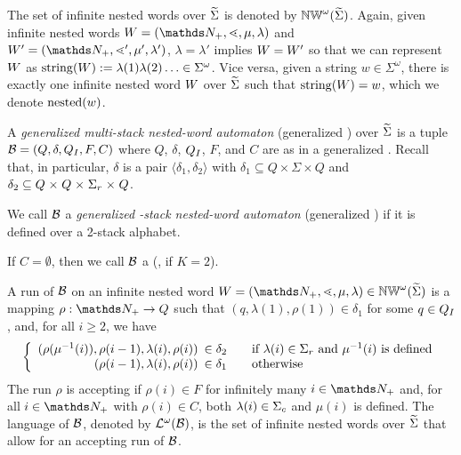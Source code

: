 \documentclass{LMCS}
\begin{document}
The set of infinite nested words over $\widetilde{\Sigma}$ is denoted by
$\mathbb{NW}^\omega(\widetilde{\Sigma})$.
Again, given infinite nested words $\nword=(\infDom,\succord,\mu,\lambda)$ and
$\nword'=(\infDom,\succord',\mu',\lambda')$, $\lambda=\lambda'$ implies
$W = W'$ so that we can represent $W$ as $\mathrm{string}(W) :=
\lambda(1) \lambda(2) \ldots \in \Sigma^\omega$.
Vice versa, given a string $w \in \Sigma^\omega$, there is exactly one
infinite nested word $W$ over $\widetilde{\Sigma}$ such that $\mathrm{string}(W) = w$,
which we denote $\mathrm{nested}(w)$.



\begin{defi}
  A \emph{generalized \Buchi multi-stack nested-word automaton} (generalized
  \Buchi \MNWA) over $\widetilde{\Sigma}$ is a tuple $\mathcal{B}=(Q,\delta,Q_I,F,C)$ where
  $Q$, $\delta$, $Q_I$, $F$, and $C$ are as in a generalized \MNWA. Recall
  that, in particular, $\delta$ is a pair $\langle \delta_1,\delta_2 \rangle$
  with $\delta_1 \mathrel{\subseteq} Q \mathrel{\times} \Sigma
  \mathrel{\times} Q$ and $\delta_2 \mathrel{\subseteq} Q \mathrel{\times} Q
  \mathrel{\times} \Sigma_r \mathrel{\times} Q$.

  We call $\mathcal{B}$ a \emph{generalized -stack nested-word automaton}
  (generalized \Buchi \tNWA) if it is defined over a 2-stack alphabet.

  If $C=\emptyset$, then we call $\mathcal{B}$ a \Buchi \MNWA (\Buchi \tNWA, if
  $K=2$).
\end{defi}

A run of $\mathcal{B}$ on an infinite nested word
$\nword=(\infDom,\succord,\mu,\lambda) \in \infNW(\crSigma)$ is a mapping
$\rho: \infDom \rightarrow Q$ such that $(q,\lambda(1),\rho(1)) \in \delta_1$
for some $q \in Q_I$, and, for all $i \ge 2$, we have
 \[\left\{
 \begin{array}{rll}
   (\rho(\mu^{-1}(i)),\rho(i-1),\lambda(i),\rho(i)) & \!\!\!\in \delta_2 &~~ \text{~if~}
   \lambda(i) \in \Sigma_r \text{~and~} \mu^{-1}(i) \text{~is~defined}\\
   (\rho(i-1),\lambda(i),\rho(i)) & \!\!\!\in \delta_1 &~~ \text{~otherwise}
 \end{array}
\right.
 \]
 The run $\rho$ is accepting if $\rho(i) \in F$ for infinitely many $i \in
 \infDom$ and, for all $i \in \infDom$ with $\rho(i) \in C$, both $\lambda(i)
 \in \Sigma_c$ and $\mu(i)$ is defined. The language of $\mathcal{B}$, denoted by
 $\mathcal{L}^\omega(\mathcal{B})$, is the set of infinite nested words over $\widetilde{\Sigma}$ that
 allow for an accepting run of $\mathcal{B}$.
\end{document}

